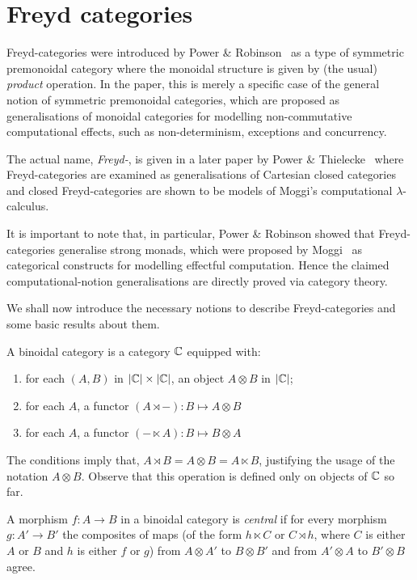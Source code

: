 \section{Freyd categories}

Freyd-categories were introduced by Power \& Robinson~\cite{pow-rob} as a type
of symmetric premonoidal category where the monoidal structure is given by
(the usual) \emph{product} operation. In the paper, this is merely a specific
case of the general notion of symmetric premonoidal categories, which are
proposed as generalisations of monoidal categories for modelling
non-commutative computational effects, such as non-determinism, exceptions and
concurrency.

The actual name, \emph{Freyd-}, is given in a later paper by Power \&
Thielecke~\cite{pow-thie} where Freyd-categories are examined as generalisations
of Cartesian closed categories and closed Freyd-categories are shown to be
models of Moggi's computational $\lambda$-calculus.

It is important to note that, in particular, Power \& Robinson showed that
Freyd-categories generalise strong monads, which were proposed by
Moggi~\cite{moggi-89} as categorical constructs for modelling effectful
computation. Hence the claimed computational-notion generalisations are
directly proved via category theory.

We shall now introduce the necessary notions to describe Freyd-categories and
some basic results about them.

\begin{definition}
    A binoidal category is a category $\mathbb{C}$ equipped with:
    \begin{enumerate}
        \item for each $(A, B)$ in $|\mathbb{C}| \times |\mathbb{C}|$, an object $A \otimes B$
            in $|\mathbb{C}|$;
        \item for each $A$, a functor $(A \rtimes -) : B \mapsto A \otimes B$
        \item for each $A$, a functor $(- \ltimes A) : B \mapsto B \otimes A$
    \end{enumerate}
\end{definition}

The conditions imply that, $A \rtimes B = A \otimes B = A \ltimes B$,
justifying the usage of the notation $A \otimes B$. Observe that this
operation is defined only on objects of $\mathbb{C}$ so far.

\begin{definition}
    A morphism $f: A \to B$ in a binoidal category is \emph{central} if for
    every morphism $g: A' \to B'$ the composites of maps (of the form $h
    \ltimes C$ or $C \rtimes h$, where $C$ is either $A$ or $B$ and $h$ is
    either $f$ or $g$) from $A \otimes A'$ to $B \otimes B'$ and from $A'
    \otimes A$ to $B' \otimes B$ agree.
\end{definition}

